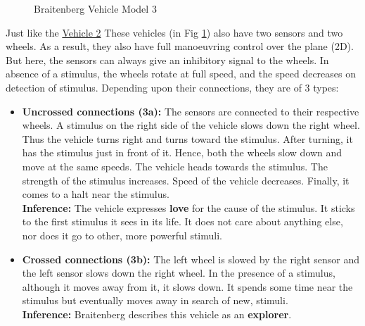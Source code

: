     \begin{figure}[t]%
        \centering
        \qquad
        \caption{Braitenberg Vehicle Model 3}%
        \label{fig:vehicle3}%
    \end{figure}

    Just like the \hyperref[sec:Vehicle_2]{Vehicle 2} These vehicles (in Fig \ref{fig:vehicle3}) also have two sensors and two wheels. As a result, they also have full manoeuvring control over the plane (2D). But here, the sensors can always give an inhibitory signal to the wheels. In absence of a stimulus, the wheels rotate at full speed, and the speed decreases on detection of stimulus. Depending upon their connections, they are of 3 types:

    \begin{itemize}
        \item \textbf{Uncrossed connections (3a):} The sensors are connected to their respective wheels. A stimulus on the right side of the vehicle slows down the right wheel. Thus the vehicle turns right and turns toward the stimulus. After turning, it has the stimulus just in front of it. Hence, both the wheels slow down and move at the same speeds. The vehicle heads towards the stimulus. The strength of the stimulus increases. Speed of the vehicle decreases. Finally, it comes to a halt near the stimulus.\\
        \textbf{Inference:} The vehicle expresses \textbf{love} for the cause of the stimulus. It sticks to the first stimulus it sees in its life. It does not care about anything else, nor does it go to other, more powerful stimuli.
        \item \textbf{Crossed connections (3b):} The left wheel is slowed by the right sensor and the left sensor slows down the right wheel. In the presence of a stimulus, although it moves away from it, it slows down. It spends some time near the stimulus but eventually moves away in search of new, stimuli.\\
        \textbf{Inference:} Braitenberg describes this vehicle as an \textbf{explorer}.
    \end{itemize}

